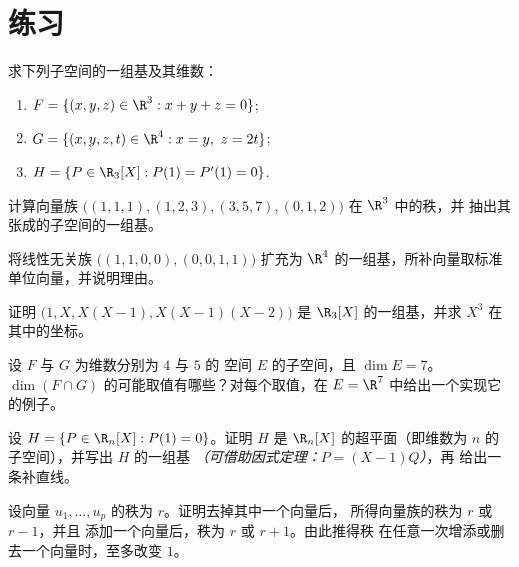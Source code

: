 \section{练习}

\begin{exercise}[$\star$]\label{exo:b1:findim:1}
求下列子空间的一组基及其维数：
\begin{enumerate}
  \item $F = \{(x,y,z) \in \R^3 : x + y + z = 0\}$;
  \item $G = \{(x,y,z,t) \in \R^4 : x = y,\ z = 2t\}$;
  \item $H = \{P \in \R_3[X] : P(1) = P'(1) = 0\}$.
\end{enumerate}
\end{exercise}

\begin{exercise}[$\star$]\label{exo:b1:findim:2}
计算向量族
$\bigl((1,1,1), (1,2,3), (3,5,7), (0,1,2)\bigr)$ 在 $\R^3$ 中的秩，并
抽出其张成的子空间的一组基。
\end{exercise}

\begin{exercise}[$\star$]\label{exo:b1:findim:3}
将线性无关族 $\bigl((1,1,0,0), (0,0,1,1)\bigr)$ 扩充为
$\R^4$ 的一组基，所补向量取标准单位向量，并说明理由。
\end{exercise}

\begin{exercise}[$\star$]\label{exo:b1:findim:4}
证明 $\bigl(1, X, X(X-1), X(X-1)(X-2)\bigr)$ 是
$\R_3[X]$ 的一组基，并求 $X^3$ 在其中的坐标。
\end{exercise}

\begin{exercise}[$\star\star$]\label{exo:b1:findim:5}
设 $F$ 与 $G$ 为维数分别为 $4$ 与 $5$ 的
空间 $E$ 的子空间，且 $\dim E = 7$。$\dim(F \cap
G)$ 的可能取值有哪些？对每个取值，在 $E = \R^7$ 中给出一个实现它的例子。
\end{exercise}

\begin{exercise}[$\star\star$]\label{exo:b1:findim:6}
设 $H = \{P \in \R_n[X] : P(1) = 0\}$。证明 $H$ 是
$\R_n[X]$ 的超平面（即维数为 $n$ 的子空间），并写出
$H$ 的一组基 \emph{（可借助因式定理：$P = (X-1)Q$）}，再
给出一条补直线。
\end{exercise}

\begin{exercise}[$\star\star$]\label{exo:b1:findim:7}
设向量 $u_1, \dots, u_p$ 的秩为 $r$。证明去掉其中一个向量后，
所得向量族的秩为 $r$ 或 $r - 1$，并且
添加一个向量后，秩为 $r$ 或 $r + 1$。由此推得秩
在任意一次增添或删去一个向量时，至多改变 $1$。
\end{exercise}

